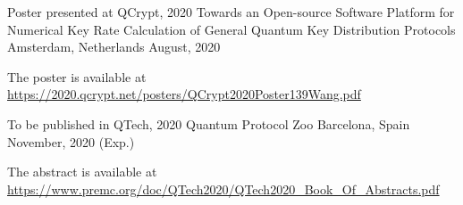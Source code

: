 

\begin{cventries}

  \cventry
    {Poster presented at QCrypt, 2020} %
    {Towards an Open-source Software Platform for Numerical Key Rate Calculation of General Quantum Key Distribution Protocols} %
    {Amsterdam, Netherlands} %
    {August, 2020} %
    {
      \begin{cvitems} %
        \item {The poster is available at \href{https://2020.qcrypt.net/posters/QCrypt2020Poster139Wang.pdf}{https://2020.qcrypt.net/posters/QCrypt2020Poster139Wang.pdf}}
      \end{cvitems}
    }

  \cventry
    {To be published in QTech, 2020} %
    {Quantum Protocol Zoo} %
    {Barcelona, Spain} %
    {November, 2020 (Exp.)} %
    {
      \begin{cvitems} %
        \item {The abstract is available at \href{https://www.premc.org/doc/QTech2020/QTech2020_Book_Of_Abstracts.pdf}{https://www.premc.org/doc/QTech2020/QTech2020\_Book\_Of\_Abstracts.pdf}}
      \end{cvitems}
    }

\end{cventries}

